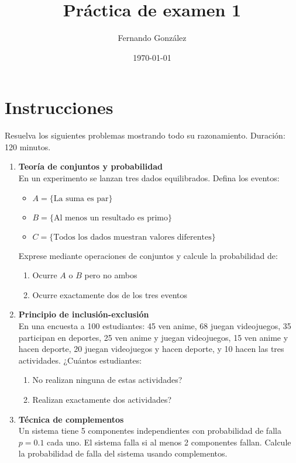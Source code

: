 \documentclass[letterpaper]{article}
\title{Práctica de examen 1}
\author{Fernando González}
\date{\today}
\begin{document}
	\maketitle
	
	\section*{Instrucciones}
	Resuelva los siguientes problemas mostrando todo su razonamiento. Duración: 120 minutos.
	
	\begin{enumerate}
		\item \textbf{Teoría de conjuntos y probabilidad}\\
		En un experimento se lanzan tres dados equilibrados. Defina los eventos:
		\begin{itemize}
			\item $A = \{\text{La suma es par}\}$
			\item $B = \{\text{Al menos un resultado es primo}\}$
			\item $C = \{\text{Todos los dados muestran valores diferentes}\}$
		\end{itemize}
		Exprese mediante operaciones de conjuntos y calcule la probabilidad de:
		\begin{enumerate}
			\item Ocurre $A$ o $B$ pero no ambos
			\item Ocurre exactamente dos de los tres eventos
		\end{enumerate}
		
		\item \textbf{Principio de inclusión-exclusión}\\
		En una encuesta a 100 estudiantes: 45 ven anime, 68 juegan videojuegos, 35 participan en deportes, 25 ven anime y juegan videojuegos, 15 ven anime y hacen deporte, 20 juegan videojuegos y hacen deporte, y 10 hacen las tres actividades. ¿Cuántos estudiantes:
		\begin{enumerate}
			\item No realizan ninguna de estas actividades?
			\item Realizan exactamente dos actividades?
		\end{enumerate}
		
		\item \textbf{Técnica de complementos}\\
		Un sistema tiene 5 componentes independientes con probabilidad de falla $p = 0.1$ cada uno. El sistema falla si al menos 2 componentes fallan. Calcule la probabilidad de falla del sistema usando complementos.
		

\end{enumerate}
\end{document}
